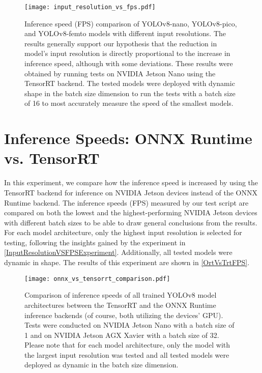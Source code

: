 \begin{figure}[t]
    \begin{framed}
        \centering
        \texttt{[image: input\_resolution\_vs\_fps.pdf]}
        \caption{Inference speed (FPS) comparison of YOLOv8-nano, YOLOv8-pico, and
        YOLOv8-femto models with different input resolutions. The results generally
        support our hypothesis that the reduction in model's input resolution is directly
        proportional to the increase in inference speed, although with some
        deviations. These results were obtained by running tests on NVIDIA Jetson
        Nano using the TensorRT backend. The tested models were deployed with
        dynamic shape in the batch size dimension to run the tests with a batch size
        of 16 to most accurately measure the speed of the smallest models.}
        \label{InputResolutionVSFPS}
    \end{framed}
\end{figure}



\section{Inference Speeds: ONNX Runtime vs. TensorRT}

In this experiment, we compare how the inference speed is increased by using the
TensorRT backend for inference on NVIDIA Jetson devices instead of the ONNX
Runtime backend. The inference speeds (FPS) measured by our test script are
compared on both the lowest and the highest-performing NVIDIA Jetson devices
with different batch sizes to be able to draw general conclusions from the
results. For each model architecture, only the highest input resolution is
selected for testing, following the insights gained by the experiment in
\autoref{InputResolutionVSFPSExperiment}. Additionally, all tested models were
dynamic in shape. The results of this experiment are shown in
\autoref{OrtVsTrtFPS}.

\begin{figure}[H]
    \begin{framed}
        \centering
        \texttt{[image: onnx\_vs\_tensorrt\_comparison.pdf]}
        \caption{Comparison of inference speeds of all trained YOLOv8 model
        architectures between the TensorRT and the ONNX Runtime inference backends
        (of course, both utilizing the devices' GPU). Tests were conducted on NVIDIA
        Jetson Nano with a batch size of 1 and on NVIDIA Jetson AGX Xavier with a
        batch size of 32. Please note that for each model architecture, only the
        model with the largest input resolution was tested and all tested models were
        deployed as dynamic in the batch size dimension.}
        \label{OrtVsTrtFPS}
    \end{framed}
\end{figure}

